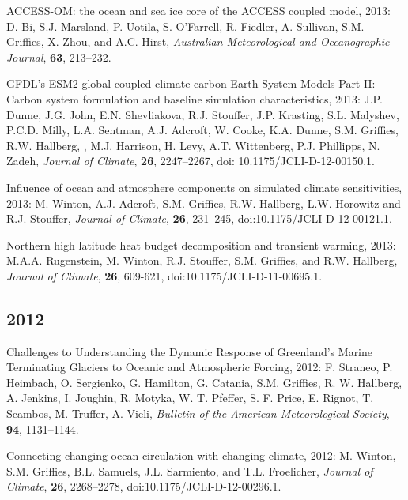 \begin{etaremune}
\item ACCESS-OM: the ocean and sea ice core of the ACCESS coupled model, 2013: D. Bi, S.J. Marsland, P. Uotila, S. O'Farrell, R. Fiedler, A. Sullivan, S.M. Grif\/f\/ies, X. Zhou, and A.C. Hirst, {\it Australian Meteorological and Oceanographic Journal}, {\bf 63}, 213--232.

\item GFDL’s ESM2 global coupled climate-carbon Earth System Models Part II: Carbon system formulation and baseline simulation characteristics, 2013: J.P. Dunne, J.G. John, E.N. Shevliakova, R.J. Stouffer, J.P. Krasting, S.L. Malyshev, P.C.D. Milly,  L.A. Sentman, A.J. Adcroft, W. Cooke, K.A. Dunne, S.M. Grif\/f\/ies, R.W. Hallberg, , M.J. Harrison, H. Levy,  A.T. Wittenberg, P.J. Phillipps, N. Zadeh, {\it Journal of Climate},  {\bf 26}, 2247--2267, doi: 10.1175/JCLI-D-12-00150.1.

\item Influence of ocean and atmosphere components on simulated climate sensitivities, 2013: M. Winton, A.J. Adcroft, S.M. Grif\/f\/ies, R.W. Hallberg, L.W. Horowitz and R.J. Stouffer, {\it Journal of Climate}, {\bf 26}, 231--245,  doi:10.1175/JCLI-D-12-00121.1.

\item Northern high latitude heat budget decomposition and transient warming, 2013: M.A.A. Rugenstein, M. Winton, R.J. Stouffer, S.M. Grif\/f\/ies, and R.W. Hallberg, {\it Journal of Climate}, {\bf 26}, 609-621, doi:10.1175/JCLI-D-11-00695.1.


\subsection*{\sc \color{Maroon} 2012}

\item Challenges to Understanding the Dynamic Response of Greenland's Marine Terminating Glaciers to Oceanic and Atmospheric Forcing, 2012: F. Straneo, P. Heimbach, O. Sergienko, G. Hamilton, G. Catania, S.M. Grif\/f\/ies, R. W. Hallberg, A. Jenkins, I. Joughin, R. Motyka, W. T. Pfeffer, S. F. Price, E. Rignot, T. Scambos, M. Truffer, A. Vieli, {\it Bulletin of the American Meteorological Society}, {\bf 94}, 1131--1144.

\item Connecting changing ocean circulation with changing climate, 2012: M. Winton, S.M. Grif\/f\/ies, B.L. Samuels, J.L. Sarmiento, and T.L. Froelicher, {\it Journal of Climate}, {\bf 26}, 2268--2278, doi:10.1175/JCLI-D-12-00296.1.


\end{etaremune}
